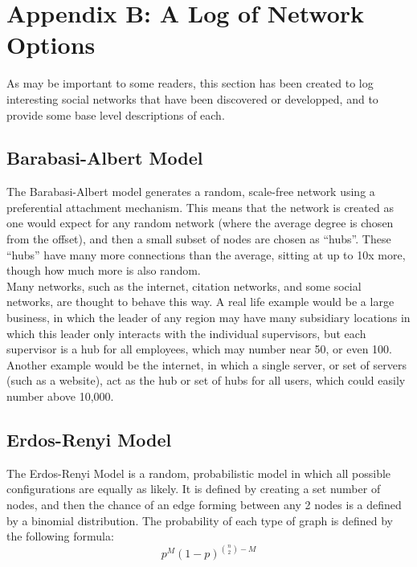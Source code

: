 \documentclass{article}
\numberwithin{equation}{section} %
\begin{document}
\newpage
\section{Appendix B: A Log of Network Options}
\begin{multicols}{2}
  As may be important to some readers, this section has been created to log interesting social networks that have been discovered or developped, and to provide some base level descriptions of each. \\

  \subsection{Barabasi-Albert Model}
  The Barabasi-Albert model\cite{BANet} generates a random, scale-free network using a preferential attachment mechanism. This means that the network is created as one would expect for any random network (where the average degree is chosen from the offset), and then a small subset of nodes are chosen as ``hubs''. These ``hubs'' have many more connections than the average, sitting at up to 10x more, though how much more is also random. \\

  Many networks, such as the internet, citation networks, and some social networks, are thought to behave this way. A real life example would be a large business, in which the leader of any region may have many subsidiary locations in which this leader only interacts with the individual supervisors, but each supervisor is a hub for all employees, which may number near 50, or even 100. \\

  Another example would be the internet, in which a single server, or set of servers (such as a website), act as the hub or set of hubs for all users, which could easily number above 10,000. 

  \subsection{Erdos-Renyi Model}
  The Erdos-Renyi Model\cite{ERNet} is a random, probabilistic model in which all possible configurations are equally as likely. It is defined by creating a set number of nodes, and then the chance of an edge forming between any 2 nodes is a defined by a binomial distribution. The probability of each type of graph is defined by the following formula:
  \[
    p^M (1-p)^{{n \choose 2} - M}
  \]


\end{multicols}
\end{document}
